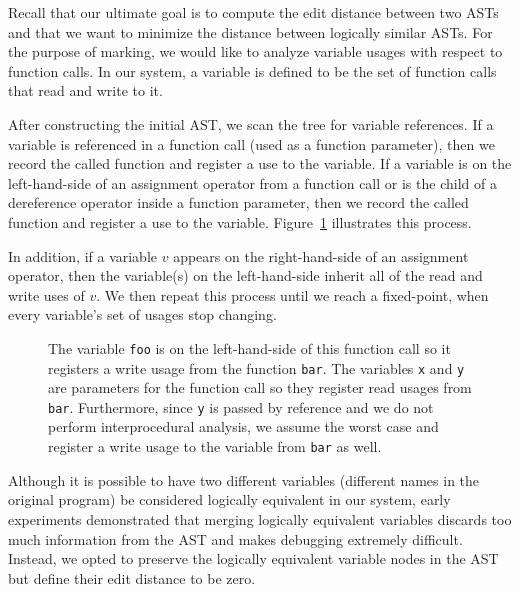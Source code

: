 Recall that our ultimate goal is to compute the edit distance between two ASTs and that  we want to minimize the distance between logically similar ASTs. For the purpose of marking, we would like to analyze variable usages with respect to function calls. In our system, a variable is defined to be the set of function calls that read and write to it.

After constructing the initial AST, we scan the tree for variable references. If a variable is referenced in a function call (used as a function parameter), then we record the called function and register a  use to the variable. If a variable is on the left-hand-side of an assignment operator from a function call or is the child of a dereference operator inside a function parameter, then we record the called function and register a  use to the variable. Figure~\ref{fig:cam-simplify-var} illustrates this process.

In addition, if a variable $v$ appears on the right-hand-side of an assignment operator, then the variable(s) on the left-hand-side inherit all of the read and write uses of $v$. We then repeat this process until we reach a fixed-point, when every variable's set of usages stop changing.

\begin{figure}

\caption[Variable Usage]{The variable \texttt{foo} is on the left-hand-side of this function call so it registers a write usage from the function \texttt{bar}. The variables \texttt{x} and \texttt{y} are parameters for the function call so they register read usages from \texttt{bar}. Furthermore, since \texttt{y} is passed by reference and we do not perform interprocedural analysis, we assume the worst case and register a write usage to the variable from \texttt{bar} as well.}
\label{fig:cam-simplify-var}
\end{figure}

Although it is possible to have two different variables (different names in the original program) be considered logically equivalent in our system, early experiments demonstrated that merging logically equivalent variables discards too much information from the AST and makes debugging extremely difficult. Instead, we opted to preserve the logically equivalent variable nodes in the AST but define their edit distance to be zero.
